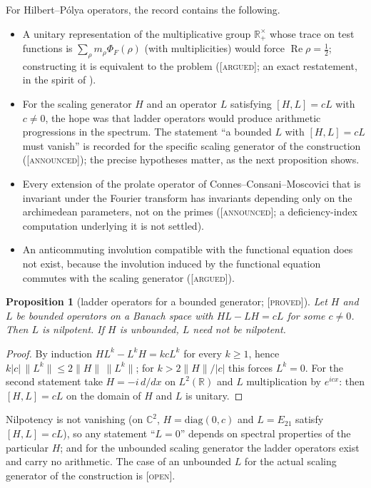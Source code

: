 \documentclass[11pt]{amsart}
\newtheorem{proposition}[theorem]{Proposition}
\theoremstyle{definition}
\theoremstyle{remark}
\numberwithin{equation}{section}
\newcommand{\C}{\mathbb{C}}
\newcommand{\R}{\mathbb{R}}
\DeclareMathOperator{\Rel}{Re}
\newcommand{\PhiF}{\Phi_F}                             %
\newcommand{\stag}[1]{\textsc{[#1]}}
\newcommand{\PROVED}{\stag{proved}}
\newcommand{\ARGUED}{\stag{argued}}
\newcommand{\OPENQ}{\stag{open}}
\newcommand{\ANNOUNCED}{\stag{announced}}
\begin{document}
For Hilbert--P\'olya operators, the record contains the following.
\begin{itemize}[leftmargin=2em]
\item A unitary representation of the multiplicative group $\R_+^\times$ whose trace on test
  functions is $\sum_\rho m_\rho \PhiF(\rho)$ (with multiplicities) would force $\Rel\rho=\frac12$;
  constructing it is equivalent to the problem (\ARGUED; an exact restatement, in the spirit of
  \cite{Connes1999}).
\item For the scaling generator $H$ and an operator $L$ satisfying $[H,L]=cL$ with $c\ne0$, the
  hope was that ladder operators would produce arithmetic progressions in the spectrum. The
  statement ``a bounded $L$ with $[H,L]=cL$ must vanish'' is recorded for the specific scaling
  generator of the construction (\ANNOUNCED); the precise hypotheses matter, as the next
  proposition shows.
\item Every extension of the prolate operator of Connes--Consani--Moscovici that is invariant under
  the Fourier transform has invariants depending only on the archimedean parameters, not on the
  primes (\ANNOUNCED; a deficiency-index computation underlying it is not settled).
\item An anticommuting involution compatible with the functional equation does not exist, because
  the involution induced by the functional equation commutes with the scaling generator (\ARGUED).
\end{itemize}

\begin{proposition}[ladder operators for a bounded generator; \PROVED]\label{w6:prop:ladder}
Let $H$ and $L$ be bounded operators on a Banach space with $HL-LH=cL$ for some $c\neq0$. Then $L$ is
nilpotent. If $H$ is unbounded, $L$ need not be nilpotent.
\end{proposition}
\begin{proof}
By induction $HL^k-L^kH=kcL^k$ for every $k\ge1$, hence $k|c|\,\|L^k\|\le2\|H\|\,\|L^k\|$; for
$k>2\|H\|/|c|$ this forces $L^k=0$. For the second statement take $H=-i\,d/dx$ on $L^2(\R)$ and $L$
multiplication by $e^{icx}$: then $[H,L]=cL$ on the domain of $H$ and $L$ is unitary.
\end{proof}

Nilpotency is not vanishing (on $\C^2$, $H=\mathrm{diag}(0,c)$ and $L=E_{21}$ satisfy $[H,L]=cL$),
so any statement ``$L=0$'' depends on spectral properties of the particular $H$; and for the
unbounded scaling generator the ladder operators exist and carry no arithmetic. The case of an
unbounded $L$ for the actual scaling generator of the construction is \OPENQ.
\end{document}
